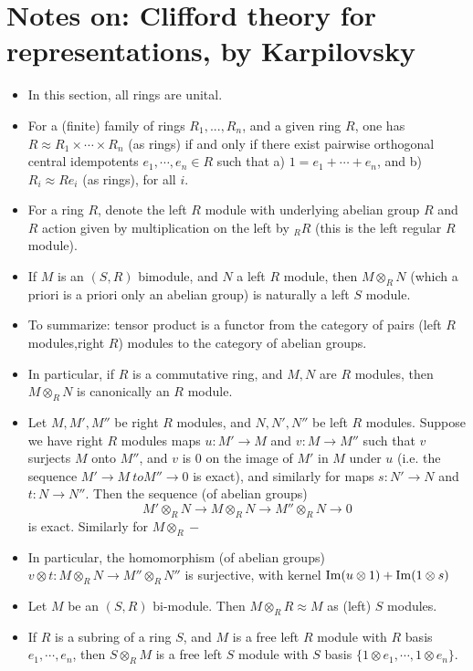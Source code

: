 \documentclass[11pt]{amsart}
\begin{document}
\section{Notes on: Clifford theory for representations, by Karpilovsky}
\begin{itemize}
  \item In this section, all rings are unital. 
  \item For a (finite) family of rings $R_{1},...,R_{n}$, and a given ring $R$, one has $R \approx R_1\times \cdots \times R_n$  (as rings) if and only if there exist pairwise orthogonal central idempotents $e_1, \cdots , e_n \in R$ such that 
  		\subitem a)   $1=e_1+ \cdots + e_n$, and 
  		\subitem b) $R_i \approx Re_i$  (as rings), for all $i$.
  \item For a ring $R$, denote the left $R$ module with underlying abelian group $R$ and $R$ action given by multiplication on the left by   $_R R$ (this is the left regular $R$ module). 
  \item If $M$ is an $(S,R)$ bimodule, and $N$ a left  $R$ module, then $M \otimes_R N$ (which a priori is a priori only an abelian group) is naturally a left $S$ module.
  \item To summarize: tensor product is a functor from the category of pairs (left $R$ modules,right $R$) modules  to the category of abelian groups. 
  \item In particular, if $R$ is a commutative ring, and $M,N$ are $R$ modules, then $M\otimes_R N$ is canonically an $R$ module.
  \item Let $M,M',M''$ be right $R$ modules, and $N,N',N''$ be left $R$ modules.  Suppose we have right $R$ modules maps $u: M' \to M$ and $v: M \to M''$ such that $v$ surjects $M$ onto $M''$, and $v$ is $0$ on the image of $M'$ in $M$ under $u$ (i.e. the sequence $M' \to  M \ to M'' \to 0$ is exact), and similarly for maps $s: N' \to N$ and $t:N \to N''$. Then the sequence (of abelian groups) \begin{equation*}  M' \otimes_R N \to M\otimes_R N \to M'' \otimes_R N \to 0 \end{equation*} is exact.  Similarly for $M \otimes_R  -$ 
  \item In particular, the homomorphism (of abelian groups) $v \otimes t :M\otimes_R N \to M'' \otimes_R N''$ is surjective, with kernel $\operatorname{Im}(u\otimes 1) + \operatorname{Im}(1\otimes s)$
  \item Let $M$ be an $(S,R)$ bi-module. Then $M\otimes _R R \approx M$ as (left) $S$ modules.
  \item If $R$ is a subring of a ring $S$, and $M$ is a free left $R$ module with $R$ basis $e_1, \cdots, e_n$, then $S \otimes_R M$ is a free left $S$ module with $S$ basis $\{1 \otimes e_1, \cdots , 1 \otimes e_n\}$. 

\end{itemize}
\end{document}
